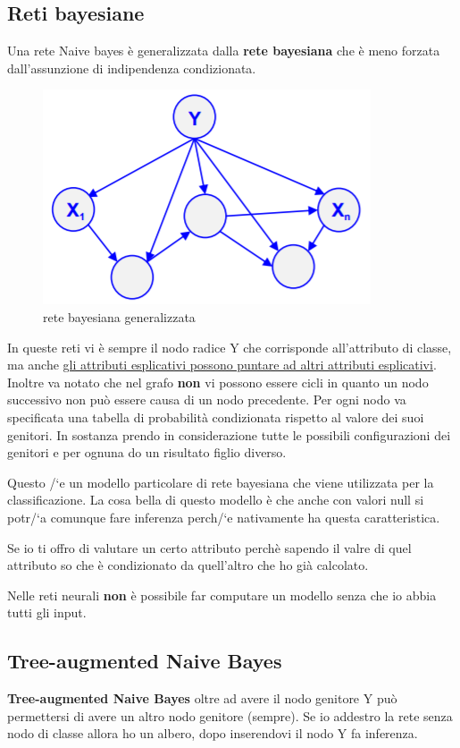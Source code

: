 \subsection{Reti bayesiane}
Una rete Naive bayes \`e generalizzata dalla \textbf{rete bayesiana} che \`e meno forzata dall'assunzione di indipendenza condizionata. 

\begin{figure}[h!]
	\centering
	\includegraphics[height=0.35 \linewidth]{classification/pict/networkbayes.png}
	\caption{rete bayesiana generalizzata}
\end{figure}

In queste reti vi \`e sempre il nodo radice Y che corrisponde all'attributo di classe, ma anche \underline{gli attributi esplicativi possono puntare ad altri attributi esplicativi}. Inoltre va notato che nel grafo \textbf{non} vi possono essere cicli in quanto un nodo successivo non pu\`o essere causa di un nodo precedente. Per ogni nodo va specificata una tabella di probabilit\`a condizionata rispetto al valore dei suoi genitori. In sostanza prendo in considerazione tutte le possibili configurazioni dei genitori e per ognuna do un risultato figlio diverso.

Questo /`e un modello particolare di rete bayesiana che viene utilizzata per la classificazione. La cosa bella di questo modello \`e che anche con valori null si potr/`a comunque fare inferenza perch/`e nativamente ha questa caratteristica. 

Se io ti offro di valutare un certo attributo perch\`e sapendo il valre di quel attributo so che \`e condizionato da quell'altro che ho gi\`a calcolato.  

Nelle reti neurali \textbf{non} \`e possibile far computare un modello senza che io abbia tutti gli input. 
\\

\subsection{Tree-augmented Naive Bayes}
\textbf{Tree-augmented Naive Bayes} oltre ad avere il nodo genitore Y pu\`o permettersi di avere un altro nodo genitore (sempre). Se io addestro la rete senza nodo di classe allora ho un albero, dopo inserendovi il nodo Y fa inferenza. 

